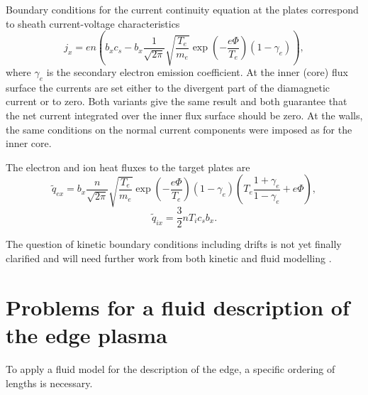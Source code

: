 \documentclass[a4paper,10pt]{report}
\begin{document}
Boundary conditions for the current continuity equation at the plates
correspond to sheath current-voltage characteristics
\begin{equation}\label{eq:sheath-voltage}
j_x = en\left(b_x c_s - b_x \frac{1}{\sqrt{2 \pi}} \sqrt{\frac{T_e}{m_e}}
      \exp \left(- \frac{e \Phi}{T_e}\right) \left(1 - \gamma_e\right)\right),
\end{equation}
where $\gamma_e$ is the secondary electron emission coefficient. At the inner
(core) flux surface the currents are set either to the divergent part
of the diamagnetic current or to zero. Both variants give the same result
and both guarantee that the net current integrated over the inner flux surface
should be zero. At the walls, the same conditions on the normal current
components were imposed as for the inner core.

The electron and ion heat fluxes to the target plates are
\begin{equation}\label{eq:target_qe}
\tilde q_{ex} = b_x \frac{n}{\sqrt{2 \pi}} \sqrt{\frac{T_e}{m_e}}
     \exp \left(- \frac{e \Phi}{T_e}\right) \left(1 - \gamma_e\right)
     \left(T_e \frac{1+\gamma_e}{1-\gamma_e} + e \Phi\right),
\end{equation}
\begin{equation}\label{eq:target_qi}
\tilde q_{ix} = \frac{3}{2}n T_i c_s b_x.
\end{equation}

The question of kinetic
boundary conditions including drifts is not yet finally clarified
and will need further work from both kinetic and fluid modelling
\cite{CHANKIN94AB,STANGEBY95B}.

\section{Problems for a fluid description of the edge plasma}

To apply a fluid model for the description of the edge,
a specific ordering of lengths is necessary.
\end{document}
